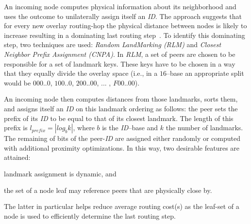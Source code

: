 An incoming node computes physical information about its neighborhood
and uses the outcome to unilaterally assign itself an \emph{ID}.
The approach suggests that for every new overlay routing-hop 
the physical distance between nodes is likely to increase
resulting in a dominating
last routing step~\cite{antony_pastry_2001,CDCR2002a}.
To identify this dominating step, two techniques are used: 
\emph{Random LandMarking (RLM)} and 
\emph{Closest Neighbor Prefix Assignment (CNPA)}.
In \emph{RLM}, a set of peers are chosen to be responsible 
for a set of landmark keys. These keys have to be chosen in a way that they
equally divide the overlay space (i.e., in a $16$--base an appropriate split
would be $000..0$, $100..0$, $200..00$, ... , $F00..00$).
%

An incoming node then computes distances from those landmarks,
sorts them, and assigns itself an \emph{ID} on this 
landmark ordering as follows:
the peer sets the prefix of its \emph{ID} to be equal to that 
of its closest landmark.
The length of this prefix is 
$l_{prefix}=|log_b k|$, where $b$ is the \emph{ID}--base 
and $k$ the number of landmarks. 
The remaining of bits of the peer-\emph{ID} are assigned either 
randomly or computed with additional proximity optimizations.
In this way, two desirable features are attained:
\begin{inparaenum}
  \item landmark assignment is dynamic, and
  \item the set of a node leaf may reference peers that are 
	physically close by.
\end{inparaenum}
The latter in particular helps reduce average routing cost(s)
as the leaf-set of a node is used to efficiently determine the 
last routing step.

